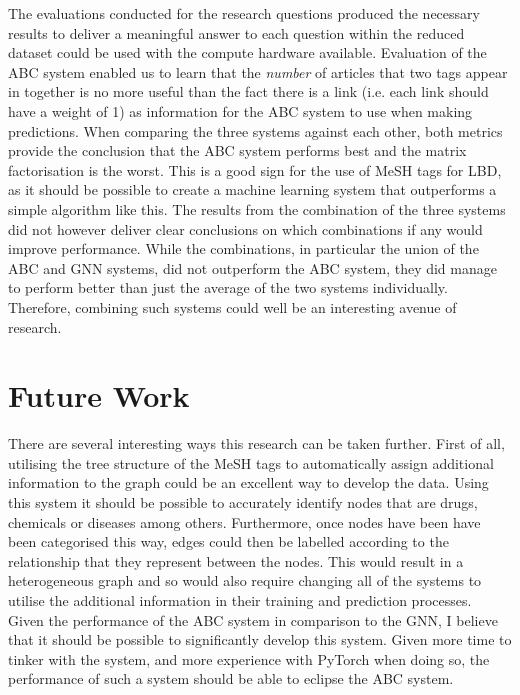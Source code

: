\documentclass{l4proj}
\begin{document}
The evaluations conducted for the research questions produced the necessary results to deliver a meaningful answer to each question within the reduced dataset could be used with the compute hardware available. Evaluation of the ABC system enabled us to learn that the \textit{number} of articles that two tags appear in together is no more useful than the fact there is a link (i.e. each link should have a weight of 1) as information for the ABC system to use when making predictions. When comparing the three systems against each other, both metrics provide the conclusion that the ABC system performs best and the matrix factorisation is the worst. This is a good sign for the use of MeSH tags for LBD, as it should be possible to create a machine learning system that outperforms a simple algorithm like this. The results from the combination of the three systems did not however deliver clear conclusions on which combinations if any would improve performance. While the combinations, in particular the union of the ABC and GNN systems, did not outperform the ABC system, they did manage to perform better than just the average of the two systems individually. Therefore, combining such systems could well be an interesting avenue of research. \\

\section{Future Work}

There are several interesting ways this research can be taken further. First of all, utilising the tree structure of the MeSH tags to automatically assign additional information to the graph could be an excellent way to develop the data. Using this system it should be possible to accurately identify nodes that are drugs, chemicals or diseases among others. Furthermore, once nodes have been have been categorised this way, edges could then be labelled according to the relationship that they represent between the nodes. This would result in a heterogeneous graph and so would also require changing all of the systems to utilise the additional information in their training and prediction processes. \\

Given the performance of the ABC system in comparison to the GNN, I believe that it should be possible to significantly develop this system. Given more time to tinker with the system, and more experience with PyTorch when doing so, the performance of such a system should be able to eclipse the ABC system. \\
\end{document}
